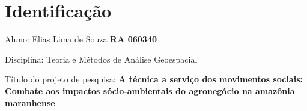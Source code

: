 \section{Identificação}

Aluno: Elias Lima de Souza \textbf{RA 060340}

Disciplina: Teoria e Métodos de Análise Geoespacial 

Título do projeto de pesquisa: \textbf{A técnica a serviço dos movimentos sociais: Combate aos impactos sócio-ambientais do agronegócio na amazônia maranhense}

